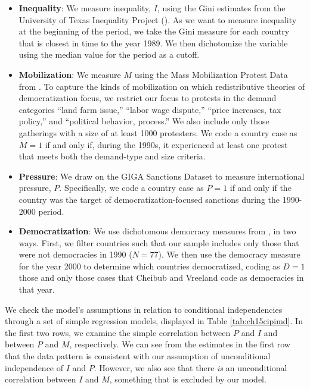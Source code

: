 \documentclass[
  12pt,
]{book}
\begin{document}
\begin{itemize}
\item
  \textbf{Inequality}: We measure inequality, \(I\), using the Gini estimates from the University of Texas Inequality Project (\citet{galbraith2019inequality}). As we want to measure inequality at the beginning of the period, we take the Gini measure for each country that is closest in time to the year 1989. We then dichotomize the variable using the median value for the period as a cutoff.
\item
  \textbf{Mobilization}: We measure \(M\) using the Mass Mobilization Protest Data from \citet{clark2016mobilization}. To capture the kinds of mobilization on which redistributive theories of democratization focus, we restrict our focus to protests in the demand categories ``land farm issue,'' ``labor wage dispute,'' ``price increases, tax policy,'' and ``political behavior, process.'' We also include only those gatherings with a size of at least 1000 protesters. We code a country case as \(M=1\) if and only if, during the 1990s, it experienced at least one protest that meets both the demand-type and size criteria.
\item
  \textbf{Pressure}: We draw on the GIGA Sanctions Dataset to measure international pressure, \(P\). Specifically, we code a country case as \(P=1\) if and only if the country was the target of democratization-focused sanctions during the 1990-2000 period.
\item
  \textbf{Democratization}: We use dichotomous democracy measures from \citet{cheibub2010democracy}, in two ways. First, we filter countries such that our sample includes only those that were not democracies in 1990 (\(N=77\)). We then use the democracy measure for the year 2000 to determine which countries democratized, coding as \(D=1\) those and only those cases that Cheibub and Vreeland code as democracies in that year.
\end{itemize}

We check the model's assumptions in relation to conditional independencies through a set of simple regression models, displayed in Table \ref{tab:ch15cipimd}. In the first two rows, we examine the simple correlation between \(P\) and \(I\) and between \(P\) and \(M\), respectively. We can see from the estimates in the first row that the data pattern is consistent with our assumption of unconditional independence of \(I\) and \(P\). However, we also see that there \emph{is} an unconditional correlation between \(I\) and \(M\), something that is excluded by our model.
\end{document}
